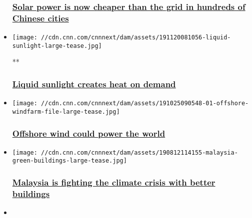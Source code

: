 \begin{itemize}
  \hypertarget{solar-power-is-now-cheaper-than-the-grid-in-hundreds-of-chinese-cities}{%
  \subsubsection{\texorpdfstring{\href{/2019/08/15/business/china-solar-electricity-scli-intl/index.html}{Solar
  power is now cheaper than the grid in hundreds of Chinese
  cities}}{Solar power is now cheaper than the grid in hundreds of Chinese cities}}\label{solar-power-is-now-cheaper-than-the-grid-in-hundreds-of-chinese-cities}}
\item
  \href{/videos/business/2019/11/20/liquid-sunlight-gec.cnn-business}{}

  \texttt{[image: //cdn.cnn.com/cnnnext/dam/assets/191120081056-liquid-sunlight-large-tease.jpg]}

  **

  \hypertarget{liquid-sunlight-creates-heat-on-demand}{%
  \subsubsection{\texorpdfstring{\href{/videos/business/2019/11/20/liquid-sunlight-gec.cnn-business}{Liquid
  sunlight creates heat on
  demand}}{Liquid sunlight creates heat on demand}}\label{liquid-sunlight-creates-heat-on-demand}}
\item
  \href{/2019/10/25/business/offshore-wind-energy/index.html}{}

  \texttt{[image: //cdn.cnn.com/cnnnext/dam/assets/191025090548-01-offshore-windfarm-file-large-tease.jpg]}

  \hypertarget{offshore-wind-could-power-the-world-}{%
  \subsubsection{\texorpdfstring{\href{/2019/10/25/business/offshore-wind-energy/index.html}{Offshore
  wind could power the world
  }}{Offshore wind could power the world }}\label{offshore-wind-could-power-the-world-}}
\item
  \href{/2019/08/12/business/malaysia-climate-change-green-buildings/index.html}{}

  \texttt{[image: //cdn.cnn.com/cnnnext/dam/assets/190812114155-malaysia-green-buildings-large-tease.jpg]}

  \hypertarget{malaysia-is-fighting-the-climate-crisis-with-better-buildings}{%
  \subsubsection{\texorpdfstring{\href{/2019/08/12/business/malaysia-climate-change-green-buildings/index.html}{Malaysia
  is fighting the climate crisis with better
  buildings}}{Malaysia is fighting the climate crisis with better buildings}}\label{malaysia-is-fighting-the-climate-crisis-with-better-buildings}}
\item
  \href{/2019/11/22/energy/china-2050-climate-crisis-report/index.html}{}


\end{itemize}
